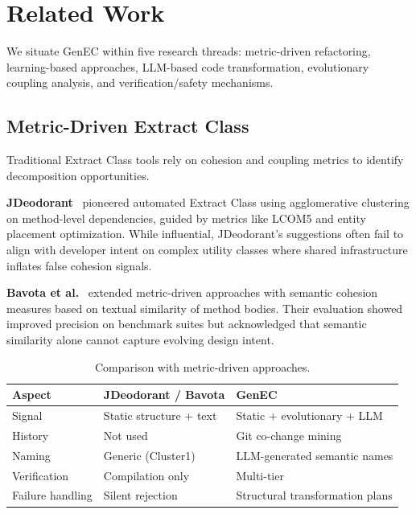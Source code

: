 \documentclass[sigconf]{acmart}
\begin{document}
\section{Related Work}
\label{sec:related}

We situate GenEC within five research threads: metric-driven refactoring,
learning-based approaches, LLM-based code transformation, evolutionary coupling
analysis, and verification/safety mechanisms.

\subsection{Metric-Driven Extract Class}
\label{sec:rw-metric}

Traditional Extract Class tools rely on cohesion and coupling metrics to
identify decomposition opportunities.

\textbf{JDeodorant}~\cite{Fokaefs2011JDeodorant} pioneered automated Extract
Class using agglomerative clustering on method-level dependencies, guided by
metrics like LCOM5 and entity placement optimization. While influential,
JDeodorant's suggestions often fail to align with developer intent on complex
utility classes where shared infrastructure inflates false cohesion signals.

\textbf{Bavota et al.}~\cite{Bavota2013EMSE} extended metric-driven
approaches with semantic cohesion measures based on textual similarity of method
bodies. Their evaluation showed improved precision on benchmark suites but
acknowledged that semantic similarity alone cannot capture evolving design
intent.

\begin{table}[t]
\centering\small
\caption{Comparison with metric-driven approaches.}
\label{tab:rw-metric}
\begin{tabularx}{\columnwidth}{@{}lXX@{}}
\toprule
\textbf{Aspect} & \textbf{JDeodorant / Bavota} & \textbf{GenEC} \\
\midrule
Signal           & Static structure + text          & Static + evolutionary + LLM \\
History          & Not used                         & Git co-change mining \\
Naming           & Generic (Cluster1)               & LLM-generated semantic names \\
Verification     & Compilation only                 & Multi-tier \\
Failure handling & Silent rejection                 & Structural transformation plans \\
\bottomrule
\end{tabularx}
\end{table}
\end{document}
